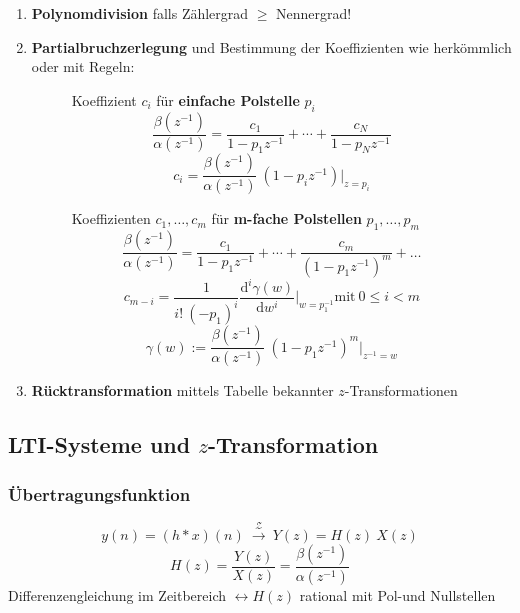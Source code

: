 \documentclass[10pt,a4paper]{article}
\newcommand{\ztransform}{
	~\xrightarrow{~\mathcal{Z}~}~
}
\begin{document}
\begin{enumerate}
\item \textbf{Polynomdivision} falls Zählergrad $\geq$ Nennergrad!
\item \textbf{Partialbruchzerlegung} und Bestimmung der Koeffizienten wie herkömmlich oder mit Regeln:
\begin{figure}[H]
	\centering
	\setlength{\fboxsep}{10pt}
	\begin{adjustbox}{valign=h,center=0.42\textwidth,margin=1ex,minipage=[t][][t]{0.37\textwidth},bgcolor=white,cfbox=black 1.5pt 0pt 1pt}
		Koeffizient $c_i$ für \textbf{einfache Polstelle} $p_i$
		\[ \frac{\beta(z^{-1})}{\alpha(z^{-1})} = \frac{c_1}{1 - p_1 z^{-1}} + \cdots + \frac{c_N}{1 - p_N z^{-1}} \]
		\[ c_i = \frac{\beta(z^{-1})}{\alpha(z^{-1})} ~ (1 - p_i z^{-1}) \bigg |_{z = p_{i}} \]
		\vspace{3.8em}
	\end{adjustbox}
	\begin{adjustbox}{valign=h,center=0.48\textwidth,margin=1ex,minipage=[t][][t]{0.43\textwidth},bgcolor=white,cfbox=black 1.5pt 0pt 1pt}
		Koeffizienten $c_1, \ldots, c_m$ für \textbf{m-fache Polstellen} $p_1, \ldots, p_m$
		\[ \frac{\beta(z^{-1})}{\alpha(z^{-1})}=\frac{c_{1}}{1-p_{1}z^{-1}}+\cdots+\frac{c_{m}}{(1-p_{1}z^{-1})^m} + \ldots \]
		\[ c_{m - i} = \frac{1}{i! ~ (-p_1)^{i}}\frac{\mathrm d^{i} \gamma(w)}{\mathrm d w^{i}} \bigg |_{w = p_1^{-1}} \text{mit} ~ 0 \leq i < m \]
		\[ \gamma(w) := \frac{\beta(z^{-1})}{\alpha(z^{-1})} ~ \left(1 - p_1 z^{-1} \right)^m \bigg |_{z^{-1} = w} \]
	\end{adjustbox}
\end{figure}

\item \textbf{Rücktransformation} mittels Tabelle bekannter $z$-Transformationen

\end{enumerate}

\subsection*{LTI-Systeme und $z$-Transformation}
\subsubsection*{Übertragungsfunktion}
\[
	y(n) = (h * x)(n) \ztransform Y(z) = H(z) ~ X(z)
\]
\[
	H(z) = \frac{Y(z)}{X(z)} = \frac{\beta(z^{-1})}{\alpha(z^{-1})}
\]
	Differenzengleichung im Zeitbereich $\leftrightarrow H(z)$ rational mit Pol-und Nullstellen\\
\end{document}

